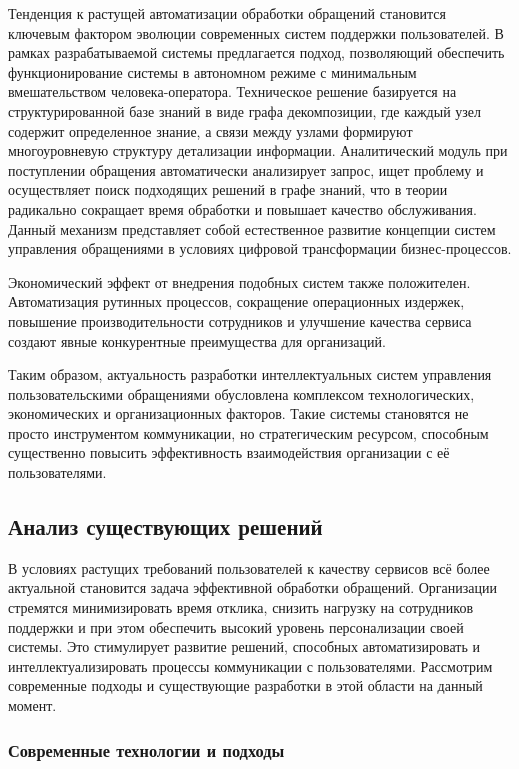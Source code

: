 Тенденция к растущей автоматизации обработки обращений становится ключевым фактором эволюции современных систем поддержки пользователей. В рамках разрабатываемой системы предлагается подход, позволяющий обеспечить функционирование системы в автономном режиме с минимальным вмешательством человека-оператора. Техническое решение базируется на структурированной базе знаний в виде графа декомпозиции, где каждый узел содержит определенное знание, а связи между узлами формируют многоуровневую структуру детализации информации. Аналитический модуль при поступлении обращения автоматически анализирует запрос, ищет проблему и осуществляет поиск подходящих решений в графе знаний, что в теории радикально сокращает время обработки и повышает качество обслуживания. Данный механизм представляет собой естественное развитие концепции систем управления обращениями в условиях цифровой трансформации бизнес-процессов.

Экономический эффект от внедрения подобных систем также положителен. Автоматизация рутинных процессов, сокращение операционных издержек, повышение производительности сотрудников и улучшение качества сервиса создают явные конкурентные преимущества для организаций.

Таким образом, актуальность разработки интеллектуальных систем управления пользовательскими обращениями обусловлена комплексом технологических, экономических и организационных факторов. Такие системы становятся не просто инструментом коммуникации, но стратегическим ресурсом, способным существенно повысить эффективность взаимодействия организации с её пользователями.

\subsection{Анализ существующих решений}

В условиях растущих требований пользователей к качеству сервисов всё более актуальной становится задача эффективной обработки обращений. Организации стремятся минимизировать время отклика, снизить нагрузку на сотрудников поддержки и при этом обеспечить высокий уровень персонализации своей системы. Это стимулирует развитие решений, способных автоматизировать и интеллектуализировать процессы коммуникации с пользователями. Рассмотрим современные подходы и существующие разработки в этой области на данный момент.

\subsubsection{Современные технологии и подходы}

